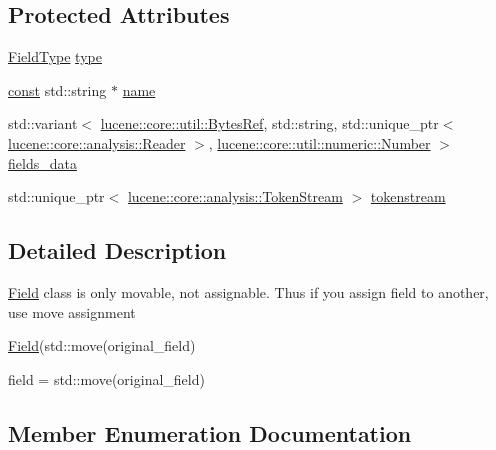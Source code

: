 \subsection*{Protected Attributes}
\begin{DoxyCompactItemize}
\item 
\mbox{\hyperlink{classlucene_1_1core_1_1document_1_1FieldType}{Field\+Type}} \mbox{\hyperlink{classlucene_1_1core_1_1document_1_1Field_a7d5849d933ebde73422710069643ccff}{type}}
\item 
\mbox{\hyperlink{ZlibCrc32_8h_a2c212835823e3c54a8ab6d95c652660e}{const}} std\+::string $\ast$ \mbox{\hyperlink{classlucene_1_1core_1_1document_1_1Field_a52f673f3b3abb14b180f5159f4726537}{name}}
\item 
std\+::variant$<$ \mbox{\hyperlink{classlucene_1_1core_1_1util_1_1BytesRef}{lucene\+::core\+::util\+::\+Bytes\+Ref}}, std\+::string, std\+::unique\+\_\+ptr$<$ \mbox{\hyperlink{classlucene_1_1core_1_1analysis_1_1Reader}{lucene\+::core\+::analysis\+::\+Reader}} $>$, \mbox{\hyperlink{classlucene_1_1core_1_1util_1_1numeric_1_1Number}{lucene\+::core\+::util\+::numeric\+::\+Number}} $>$ \mbox{\hyperlink{classlucene_1_1core_1_1document_1_1Field_a2ae4ce107a1c3f4ea56f9ab812e94153}{fields\+\_\+data}}
\item 
std\+::unique\+\_\+ptr$<$ \mbox{\hyperlink{classlucene_1_1core_1_1analysis_1_1TokenStream}{lucene\+::core\+::analysis\+::\+Token\+Stream}} $>$ \mbox{\hyperlink{classlucene_1_1core_1_1document_1_1Field_a9ae72843cbdd8524362f65ee9f2c7355}{tokenstream}}
\end{DoxyCompactItemize}


\subsection{Detailed Description}
\mbox{\hyperlink{classlucene_1_1core_1_1document_1_1Field}{Field}} class is only movable, not assignable. Thus if you assign field to another, use move assignment
\begin{DoxyEnumerate}
\item \mbox{\hyperlink{classlucene_1_1core_1_1document_1_1Field}{Field}}(std\+::move(original\+\_\+field)
\item field = std\+::move(original\+\_\+field) 
\end{DoxyEnumerate}

\subsection{Member Enumeration Documentation}
\mbox{\label{classlucene_1_1core_1_1document_1_1Field_a7d5d79f0c56d3548ab8d46d0e7dae35d}} 
